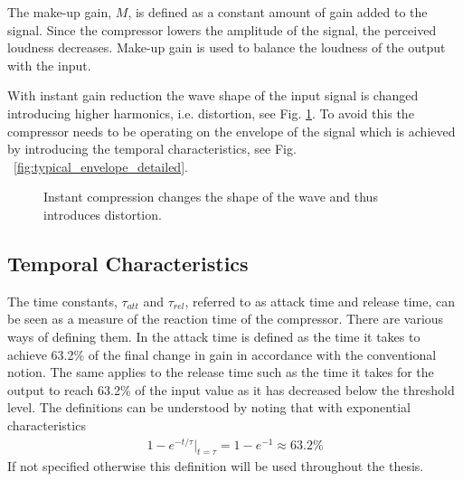 \documentclass[../main2.tex]{subfiles}
\providecommand{\rootdir}{..}
\begin{document}
The make-up gain, $M$, is defined as a constant amount of gain added to the signal. Since the compressor lowers the amplitude of the signal, the perceived loudness decreases. Make-up gain is used to balance the loudness of the output with the input.

With instant gain reduction the wave shape of the input signal is changed introducing higher harmonics, i.e. distortion, see Fig. \ref{fig:instant_comp}. To avoid this the compressor needs to be operating on the envelope of the signal which is achieved by introducing the temporal characteristics, see Fig. ~\ref{fig:typical_envelope_detailed}.
\begin{figure}[ht]
\centering

\caption{Instant compression changes the shape of the wave and thus introduces distortion.} 
\label{fig:instant_comp}
\end{figure}
\subsection{Temporal Characteristics}
The time constants, $\tau_{att}$ and $\tau_{rel}$, referred to as attack time and release time, can be seen as a measure of the reaction time of the compressor. There are various ways of defining them. In \cite{mcnally1984dynamic} the attack time is defined as the time it takes to achieve 63.2\% of the final change in gain in accordance with the conventional notion. The same applies to the release time such as the time it takes for the output to reach 63.2\% of the input value as it has decreased below the threshold level. The definitions can be understood by noting that with exponential characteristics
\begin{align}
1-e^{-t / \tau}\rvert_{t=\tau} = 1-e^{-1} \approx 63.2\% \label{eq:time_const}
\end{align}
If not specified otherwise this definition will be used throughout the thesis.
\end{document}
